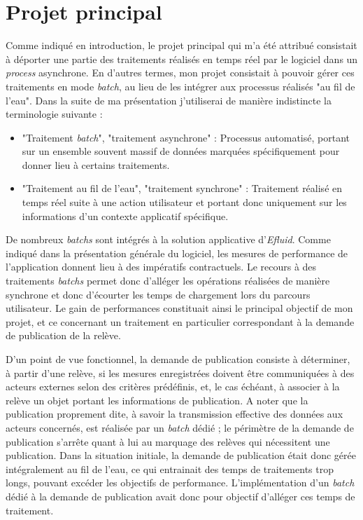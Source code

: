 \documentclass[a4paper, 12pt]{report}
\begin{document}
\section{Projet principal}

Comme indiqué en introduction, le projet principal qui m'a été attribué consistait à déporter une partie des traitements réalisés en temps réel par le logiciel dans un \textit{process} asynchrone. En d'autres termes, mon projet consistait à pouvoir gérer ces traitements en mode \textit{batch}, au lieu de les intégrer aux processus réalisés "au fil de l'eau". Dans la suite de ma présentation j'utiliserai de manière indistincte la terminologie suivante :\\

\begin{itemize}
  \item "Traitement \textit{batch}", "traitement asynchrone" : Processus automatisé, portant sur un ensemble souvent massif de données marquées spécifiquement pour donner lieu à certains traitements.
  \item "Traitement au fil de l'eau", "traitement synchrone" : Traitement réalisé en temps réel suite à une action utilisateur et portant donc uniquement sur les informations d'un contexte applicatif spécifique.
\end{itemize}
\vspace{0.5cm}

De nombreux \textit{batchs} sont intégrés à la solution applicative d'\textit{Efluid}. Comme indiqué dans la présentation générale du logiciel, les mesures de performance de l'application donnent lieu à des impératifs contractuels. Le recours à des traitements \textit{batchs} permet donc d'alléger les opérations réalisées de manière synchrone et donc d'écourter les temps de chargement lors du parcours utilisateur. Le gain de performances constituait ainsi le principal objectif de mon projet, et ce concernant un traitement en particulier correspondant à la demande de publication de la relève.

D'un point de vue fonctionnel, la demande de publication consiste à déterminer, à partir d'une relève, si les mesures enregistrées doivent être communiquées à des acteurs externes selon des critères prédéfinis, et, le cas échéant, à associer à la relève un objet portant les informations de publication. A noter que la publication proprement dite, à savoir la transmission effective des données aux acteurs concernés, est réalisée par un \textit{batch} dédié ; le périmètre de la demande de publication s'arrête quant à lui au marquage des relèves qui nécessitent une publication. Dans la situation initiale, la demande de publication était donc gérée intégralement au fil de l'eau, ce qui entrainait des temps de traitements trop longs, pouvant excéder les objectifs de performance. L'implémentation d'un \textit{batch} dédié à la demande de publication avait donc pour objectif d'alléger ces temps de traitement.\\
\end{document}
